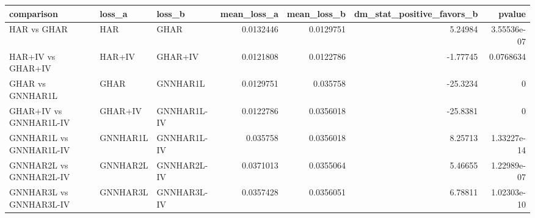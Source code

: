 \begin{tabular}{lllrrrr}
\toprule
comparison & loss_a & loss_b & mean_loss_a & mean_loss_b & dm_stat_positive_favors_b & pvalue \\
\midrule
HAR vs GHAR & HAR & GHAR & 0.0132446 & 0.0129751 & 5.24984 & 3.55536e-07 \\
HAR+IV vs GHAR+IV & HAR+IV & GHAR+IV & 0.0121808 & 0.0122786 & -1.77745 & 0.0768634 \\
GHAR vs GNNHAR1L & GHAR & GNNHAR1L & 0.0129751 & 0.035758 & -25.3234 & 0 \\
GHAR+IV vs GNNHAR1L-IV & GHAR+IV & GNNHAR1L-IV & 0.0122786 & 0.0356018 & -25.8381 & 0 \\
GNNHAR1L vs GNNHAR1L-IV & GNNHAR1L & GNNHAR1L-IV & 0.035758 & 0.0356018 & 8.25713 & 1.33227e-14 \\
GNNHAR2L vs GNNHAR2L-IV & GNNHAR2L & GNNHAR2L-IV & 0.0371013 & 0.0355064 & 5.46655 & 1.22989e-07 \\
GNNHAR3L vs GNNHAR3L-IV & GNNHAR3L & GNNHAR3L-IV & 0.0357428 & 0.0356051 & 6.78811 & 1.02303e-10 \\
\bottomrule
\end{tabular}
